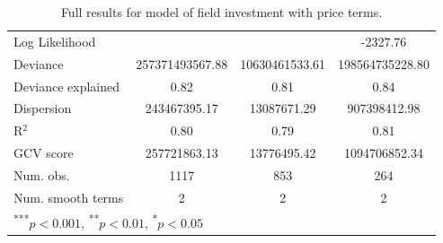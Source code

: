 \documentclass[12pt]{article}
\begin{document}
\begin{table}
\begin{center}
\begin{tabular}{l c c c }
Log Likelihood                       &                 &                & -2327.76        \\
Deviance                             & 257371493567.88 & 10630461533.61 & 198564735228.80 \\
Deviance explained                   & 0.82            & 0.81           & 0.84            \\
Dispersion                           & 243467395.17    & 13087671.29    & 907398412.98    \\
R$^2$                                & 0.80            & 0.79           & 0.81            \\
GCV score                            & 257721863.13    & 13776495.42    & 1094706852.34   \\
Num. obs.                            & 1117            & 853            & 264             \\
Num. smooth terms                    & 2               & 2              & 2               \\
\hline
\multicolumn{4}{l}{\scriptsize{\textsuperscript{***}$p<0.001$, 
  \textsuperscript{**}$p<0.01$, 
  \textsuperscript{*}$p<0.05$}}
\end{tabular}
\caption{Full results for model of field investment with price terms.}
\label{table:investment}
\end{center}
\end{table}


\end{document}
